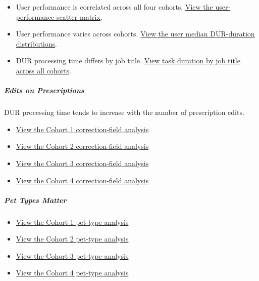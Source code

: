\documentclass[
]{article}
\providecommand{\tightlist}{%
  \setlength{\itemsep}{0pt}\setlength{\parskip}{0pt}}
\begin{document}
\begin{itemize}
\tightlist
\item
  User performance is correlated across all four cohorts.
  \href{../../charts/user-performance-analysis/user-performance-median-all-cohorts-scatter-matrix.png}{View
  the user-performance scatter matrix}.
\item
  User performance varies across cohorts.
  \href{../../charts/user-performance-analysis/user-median-dur-duration-distributions.png}{View
  the user median DUR-duration distributions}.
\item
  DUR processing time differs by job title.
  \href{../../charts/tasks-based-distributions/task-duration-by-job-title-all-cohorts-boxplots.png}{View
  task duration by job title across all cohorts}.
\end{itemize}

\subparagraph{Edits on Prescriptions}\label{edits-on-prescriptions}

DUR processing time tends to increase with the number of prescription
edits.

\begin{itemize}
\tightlist
\item
  \href{../../charts/ncorrection-fields-analysis/ncorrection-fields-analysis-cohort-1.png}{View
  the Cohort 1 correction-field analysis}
\item
  \href{../../charts/ncorrection-fields-analysis/ncorrection-fields-analysis-cohort-2.png}{View
  the Cohort 2 correction-field analysis}
\item
  \href{../../charts/ncorrection-fields-analysis/ncorrection-fields-analysis-cohort-3.png}{View
  the Cohort 3 correction-field analysis}
\item
  \href{../../charts/ncorrection-fields-analysis/ncorrection-fields-analysis-cohort-4.png}{View
  the Cohort 4 correction-field analysis}
\end{itemize}

\subparagraph{Pet Types Matter}\label{pet-types-matter}

\begin{itemize}
\tightlist
\item
  \href{../../charts/pettype-analysis/pettype-analysis-cohort-1.png}{View
  the Cohort 1 pet-type analysis}
\item
  \href{../../charts/pettype-analysis/pettype-analysis-cohort-2.png}{View
  the Cohort 2 pet-type analysis}
\item
  \href{../../charts/pettype-analysis/pettype-analysis-cohort-3.png}{View
  the Cohort 3 pet-type analysis}
\item
  \href{../../charts/pettype-analysis/pettype-analysis-cohort-4.png}{View
  the Cohort 4 pet-type analysis}
\end{itemize}
\end{document}
